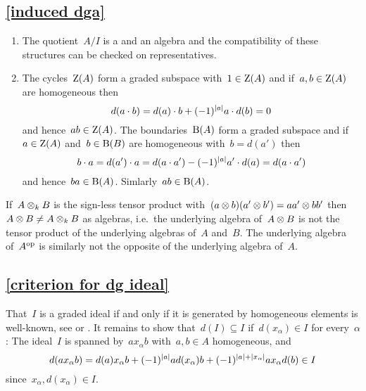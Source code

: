 \subsection{\cref{induced dga}}
\label{induced dga proof}

\begin{enumerate}[start=3]
  \item
    The quotient~$A/I$ is a {\dgv} and an algebra and the compatibility of these structures can be checked on representatives.
  \item
    The cycles~$\operatorname{Z}(A)$ form a graded subspace with~$1 \in \operatorname{Z}(A)$ and if~$a, b \in \operatorname{Z}(A)$ are homogeneous then
    \[
      d(a \cdot b)
      =
      d(a) \cdot b
      +
      (-1)^{\lvert a\rvert} a \cdot d(b)
      =
      0
    \]
    and hence~$ab \in \operatorname{Z}(A)$.
    The boundaries~$\operatorname{B}(A)$ form a graded subspace and if~$a \in \operatorname{Z}(A)$ and~$b \in \operatorname{B}(B)$ are homogeneous with~$b = d(a')$ then
    \[
      b \cdot a
      =
      d(a') \cdot a
      =
      d(a \cdot a')
      -
      (-1)^{\lvert a\rvert} a' \cdot d(a)
      =
      d(a \cdot a')
    \]
    and hence~$ba \in \operatorname{B}(A)$.
    Simlarly~$ab \in \operatorname{B}(A)$.
  \leavevmode
\end{enumerate}

\begin{warning}
  If~$A \otimes_k B$ is the sign-less tensor product with~$(a \otimes b)(a' \otimes b') = a a' \otimes b b'$ then~$A \otimes B \neq A \otimes_k B$ as algebras, i.e.\ the underlying algebra of~$A \otimes B$ is not the tensor product of the underlying algebras of~$A$ and~$B$.
  The underlying algebra of~$A^{\mathrm{op}}$ is similarly not the opposite of the underlying algebra of~$A$.
\end{warning}





\subsection{\cref{criterion for dg ideal}}
\label{criterion for dg ideal proof}

That~$I$ is a graded ideal if and only if it is generated by homogeneous elements is  well-known, see \cite[IX, 2.5]{lang} or \cite[II.{\S}11.3]{bourbaki}.
It remains to show that~$d(I) \subseteq I$ if~$d(x_\alpha) \in I$ for every~$\alpha$:
The ideal~$I$ is spanned by~$a x_\alpha b$ with~$a, b \in A$ homogeneous, and
\[
  d(a x_\alpha b)
  =
    d(a) x_\alpha b
  + (-1)^{\lvert a\rvert} a d(x_\alpha) b
  + (-1)^{\lvert a\rvert + \lvert x_\alpha\rvert} a x_\alpha d(b)
  \in
  I
\]
since~$x_\alpha, d(x_\alpha) \in I$.





